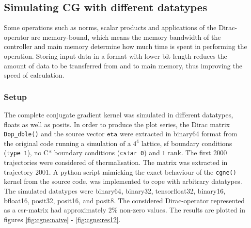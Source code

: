 \documentclass{article}
\theoremstyle{plain} %
\theoremstyle{convention} %
\theoremstyle{remark} %
\def\code#1{\texttt{#1}}
\numberwithin{equation}{section}
\begin{document}
\subsection{Simulating CG with different datatypes}

\label{sec:simulating_cgne}

Some operations such as norms, scalar products and applications of the Dirac-operator are memory-bound, which means the memory bandwidth of the controller and main memory determine how much time is spent in performing the operation. Storing input data in a format with lower bit-length reduces the amount of data to be transferred from and to main memory, thus improving the speed of calculation.

\subsubsection{Setup}

The complete conjugate gradient kernel was simulated in different datatypes, floats as well as posits. In order to produce the plot series, the Dirac matrix \code{Dop\_dble()} and the source vector $\code{eta}$ were extracted in \gls{binary64} format from the original code running a simulation of a $4^4$ lattice, \acrfull{sf} boundary conditions (\code{type 1}), no C* boundary conditions (\code{cstar 0}) and $1$ rank. The first \num{2000} trajectories were considered of thermalisation. The matrix was extracted in trajectory \num{2001}. A python script mimicking the exact behaviour of the \code{cgne()} kernel from the source code, was implemented to cope with arbitrary datatypes. The simulated datatypes were \gls{binary64}, \gls{binary32}, \gls{tensorfloat32}, \gls{binary16}, \gls{bfloat16}, \gls{posit32}, \gls{posit16}, and \gls{posit8}. The considered Dirac-operator represented as a \acrshort{csr}-matrix had approximately \num{2}\% non-zero values. The results are plotted in figures \ref{fig:cgne:naive} - \ref{fig:cgne:res12}.
\end{document}
